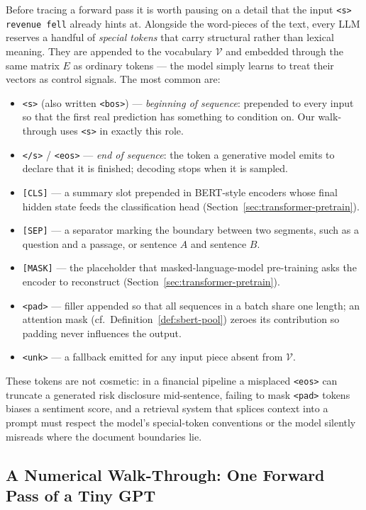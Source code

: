 \begin{deepdive}
Before tracing a forward pass it is worth pausing on a detail that the input
\texttt{<s> revenue fell} already hints at.  Alongside the word-pieces of the text,
every LLM reserves a handful of \emph{special tokens} that carry structural rather
than lexical meaning.  They are appended to the vocabulary $\mathcal{V}$ and embedded
through the same matrix $E$ as ordinary tokens --- the model simply learns to treat
their vectors as control signals.  The most common are:
\begin{itemize}
  \item \texttt{<s>} (also written \texttt{<bos>}) --- \emph{beginning of sequence}:
        prepended to every input so that the first real prediction has something to
        condition on.  Our walk-through uses \texttt{<s>} in exactly this role.
  \item \texttt{</s>} / \texttt{<eos>} --- \emph{end of sequence}: the token a
        generative model emits to declare that it is finished; decoding stops when it
        is sampled.
  \item \texttt{[CLS]} --- a summary slot prepended in BERT-style encoders whose final
        hidden state feeds the classification head
        (Section~\ref{sec:transformer-pretrain}).
  \item \texttt{[SEP]} --- a separator marking the boundary between two segments, such
        as a question and a passage, or sentence $A$ and sentence $B$.
  \item \texttt{[MASK]} --- the placeholder that masked-language-model pre-training
        asks the encoder to reconstruct (Section~\ref{sec:transformer-pretrain}).
  \item \texttt{<pad>} --- filler appended so that all sequences in a batch share one
        length; an attention mask (cf.\ Definition~\ref{def:sbert-pool}) zeroes its
        contribution so padding never influences the output.
  \item \texttt{<unk>} --- a fallback emitted for any input piece absent from
        $\mathcal{V}$.
\end{itemize}
These tokens are not cosmetic: in a financial pipeline a misplaced \texttt{<eos>} can
truncate a generated risk disclosure mid-sentence, failing to mask \texttt{<pad>}
tokens biases a sentiment score, and a retrieval system that splices context into a
prompt must respect the model's special-token conventions or the model silently
misreads where the document boundaries lie.

\subsection{A Numerical Walk-Through: One Forward Pass of a Tiny GPT}
\label{sec:transformer-walkthrough}


\end{deepdive}
